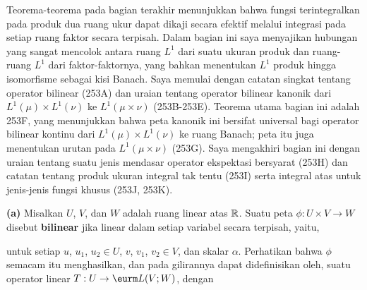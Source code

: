 
\def\chaptername{Ukuran produk}
\def\sectionname{Produk tensor}


Teorema-teorema pada bagian terakhir menunjukkan bahwa fungsi terintegralkan pada
produk dua ruang ukur dapat dikaji secara efektif melalui
integrasi pada setiap ruang faktor secara terpisah. Dalam bagian ini saya menyajikan
hubungan yang sangat mencolok antara ruang $L^1$ dari suatu ukuran
produk dan ruang-ruang $L^1$ dari faktor-faktornya, yang bahkan menentukan
$L^1$ produk hingga isomorfisme sebagai kisi Banach. Saya memulai dengan
catatan singkat tentang operator bilinear (253A) dan uraian tentang operator
bilinear kanonik dari $L^1(\mu)\times L^1(\nu)$ ke $L^1(\mu\times\nu)$
(253B-253E). Teorema utama bagian ini adalah 253F, yang menunjukkan bahwa
peta kanonik ini bersifat universal bagi operator bilinear kontinu dari
$L^1(\mu)\times L^1(\nu)$ ke ruang Banach; peta itu juga menentukan
urutan pada $L^1(\mu\times\nu)$ (253G). Saya mengakhiri bagian ini dengan uraian tentang
suatu jenis mendasar operator ekspektasi bersyarat (253H) dan catatan
tentang produk ukuran integral tak tentu (253I) serta integral atas
untuk jenis-jenis fungsi khusus (253J, 253K).

 {\bf (a)} Misalkan $U$, $V$, dan $W$ adalah ruang linear atas
$\Bbb  R$. Suatu peta
$\phi:U\times V\to W$ disebut {\bf bilinear} jika linear dalam setiap variabel
secara terpisah, yaitu,




\noindent untuk setiap $u$, $u_1$, $u_2\in U$, $v$, $v_1$, $v_2\in V$, dan
skalar $\alpha$. Perhatikan bahwa $\phi$ semacam itu menghasilkan, dan pada
gilirannya dapat didefinisikan oleh, suatu operator linear
$T:U\to\eurm L(V;W)$, dengan


